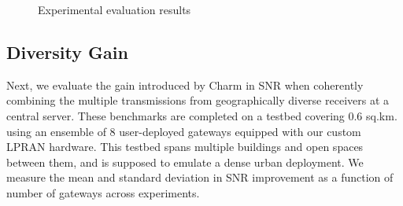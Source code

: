 \begin{figure}[!t]
\centering
{}
\hfill
{}
\hfill
{}
\compactimg
\caption{Experimental evaluation results}
\label{fig:results}
\compactimg
\end{figure}

\subsection{Diversity Gain}
\label{sec:diversity-gain-eval}

Next, we evaluate the  gain introduced by Charm in SNR when coherently
combining the multiple transmissions from geographically diverse receivers at
a central server. These benchmarks are completed on a testbed covering 0.6
sq.km. using an ensemble of 8 user-deployed gateways equipped with our custom
LPRAN hardware. This testbed spans multiple buildings and open spaces between
them, and is supposed to emulate a dense urban deployment. We measure the mean
and standard deviation in SNR improvement as a function of number of gateways
across experiments.

